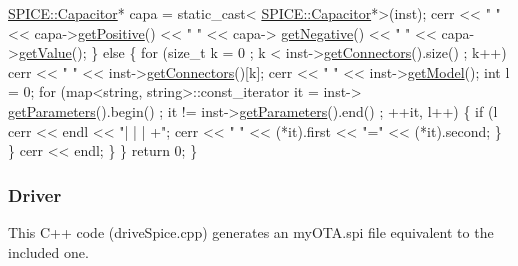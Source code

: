 \begin{DoxyCodeInclude}
                \hyperlink{class_s_p_i_c_e_1_1_capacitor}{SPICE::Capacitor}* capa = \textcolor{keyword}{static\_cast<}
      \hyperlink{class_s_p_i_c_e_1_1_capacitor}{SPICE::Capacitor}*\textcolor{keyword}{>}(inst);
                cerr << \textcolor{stringliteral}{" "} << capa->\hyperlink{class_s_p_i_c_e_1_1_capacitor_a1adb347b9a2c2da556e4417ab0eec0e1}{getPositive}() << \textcolor{stringliteral}{" "} << capa->
      \hyperlink{class_s_p_i_c_e_1_1_capacitor_a8b4ab73ed1d99c533aa22af0a37ebb0d}{getNegative}() << \textcolor{stringliteral}{" "} << capa->\hyperlink{class_s_p_i_c_e_1_1_capacitor_a4c052cb2622c580a250b2c783a436882}{getValue}();
            \} \textcolor{keywordflow}{else} \{
                \textcolor{keywordflow}{for} (\textcolor{keywordtype}{size\_t} k = 0 ; k < inst->\hyperlink{class_s_p_i_c_e_1_1_instance_acce8940edeaa3d79c522006f987e0711}{getConnectors}().size() ; k++)
                    cerr << \textcolor{stringliteral}{" "} << inst->\hyperlink{class_s_p_i_c_e_1_1_instance_acce8940edeaa3d79c522006f987e0711}{getConnectors}()[k];
                cerr << \textcolor{stringliteral}{" "} << inst->\hyperlink{class_s_p_i_c_e_1_1_instance_afc74cbe93df9c473a53db83a325f8f9d}{getModel}();
                \textcolor{keywordtype}{int} l = 0;
                \textcolor{keywordflow}{for} (map<string, string>::const\_iterator it = inst->
      \hyperlink{class_s_p_i_c_e_1_1_instance_aee7d59083b78d31ac5c19ab508da91e0}{getParameters}().begin() ; it != inst->\hyperlink{class_s_p_i_c_e_1_1_instance_aee7d59083b78d31ac5c19ab508da91e0}{getParameters}().end() ; ++it, l++) \{
                    \textcolor{keywordflow}{if} (l%
                        cerr << endl << \textcolor{stringliteral}{"| | | +"};
                    cerr << \textcolor{stringliteral}{" "} << (*it).first << \textcolor{stringliteral}{"="} << (*it).second;
                \}
            \}
            cerr << endl;
        \}
    \}
    \textcolor{keywordflow}{return} 0;
\}

\end{DoxyCodeInclude}
\hypertarget{spice_spiceDriveC}{}\subsubsection{Driver}\label{spice_spiceDriveC}
This C++ code ({\ttfamily drive\+Spice.\+cpp}) generates an my\+O\+T\+A.\+spi file equivalent to the included one. 
